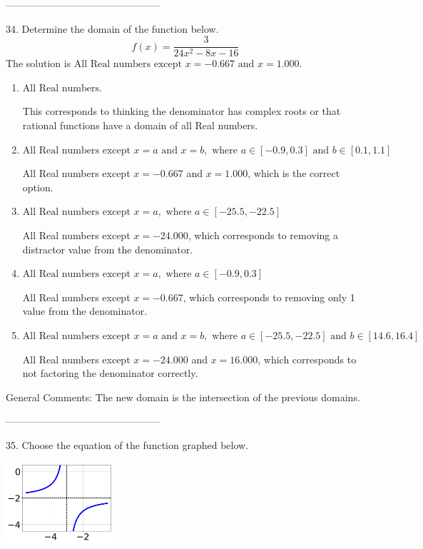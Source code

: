 \documentclass{extbook}[14pt]
\begin{document}
-----------------------------------------------

34. Determine the domain of the function below.
\[ f(x) = \frac{3}{24x^{2} -8 x -16} \] 
The solution is $ \text{All Real numbers except } x = -0.667 \text{ and } x = 1.000. $ 

\begin{enumerate}[label=\Alph*.] 
\item $ \text{All Real numbers.} $ 

 This corresponds to thinking the denominator has complex roots or that rational functions have a domain of all Real numbers. 
\item $ \text{All Real numbers except } x = a \text{ and } x = b, \text{ where } a \in [-0.9, 0.3] \text{ and } b \in [0.1, 1.1] $ 

 All Real numbers except $x = -0.667$ and $x = 1.000$, which is the correct option. 
\item $ \text{All Real numbers except } x = a, \text{ where } a \in [-25.5, -22.5] $ 

 All Real numbers except $x = -24.000$, which corresponds to removing a distractor value from the denominator. 
\item $ \text{All Real numbers except } x = a, \text{ where } a \in [-0.9, 0.3] $ 

 All Real numbers except $x = -0.667$, which corresponds to removing only 1 value from the denominator. 
\item $ \text{All Real numbers except } x = a \text{ and } x = b, \text{ where } a \in [-25.5, -22.5] \text{ and } b \in [14.6, 16.4] $ 

 All Real numbers except $x = -24.000$ and $x = 16.000$, which corresponds to not factoring the denominator correctly. 
\end{enumerate} 
 
General Comments: The new domain is the intersection of the previous domains.

-----------------------------------------------

35. Choose the equation of the function graphed below.
\begin{center} \includegraphics[width=0.3\textwidth]{../Figures/rationalGraphToEquationC.png} \end{center} 
\end{document}
